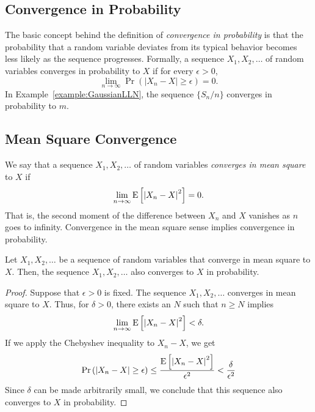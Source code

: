 \subsection{Convergence in Probability}

The basic concept behind the definition of \emph{convergence in probability} is that the probability that a random variable deviates from its typical behavior becomes less likely as the sequence progresses. 
Formally, a sequence $X_1, X_2, \ldots$ of random variables converges in probability to $X$ if for every $\epsilon > 0$,
\begin{equation*}
\lim_{n \rightarrow \infty} \Pr \left( \left| X_n - X \right| \geq \epsilon \right) = 0 .
\end{equation*}
In Example~\ref{example:GaussianLLN}, the sequence $\{ S_n / n \}$ converges in probability to $m$.


\subsection{Mean Square Convergence}

We say that a sequence $X_1, X_2, \ldots$ of random variables \emph{converges in mean square} to $X$ if 
\begin{equation*}
\lim_{n \rightarrow \infty} \mathrm{E} \left[ \left| X_n - X \right|^2 \right] = 0 .
\end{equation*}
That is, the second moment of the difference between $X_n$ and $X$ vanishes as $n$ goes to infinity.
Convergence in the mean square sense implies convergence in probability.

\begin{proposition} \label{proposition:ConvergenceImplication1}
Let $X_1, X_2, \ldots$ be a sequence of random variables that converge in mean square to $X$.
Then, the sequence $X_1, X_2, \ldots$ also converges to $X$ in probability.
\end{proposition}
\begin{proof}
Suppose that $\epsilon > 0$ is fixed.
The sequence $X_1, X_2, \ldots$ converges in mean square to $X$.
Thus, for $\delta > 0$, there exists an $N$ such that $n \geq N$ implies
\begin{equation*}
\lim_{n \rightarrow \infty} \mathrm{E} \left[ \left| X_n - X \right|^2 \right] < \delta .
\end{equation*}
If we apply the Chebyshev inequality to $X_n - X$, we get
\begin{equation*}
\Pr \left( \left| X_n - X \right| \geq \epsilon \right)
\leq \frac{ \mathrm{E} \left[ \left| X_n - X \right|^2 \right] }{ \epsilon^2 }
< \frac{ \delta }{ \epsilon^2 }
\end{equation*}
Since $\delta$ can be made arbitrarily small, we conclude that this sequence also converges to $X$ in probability.
\end{proof}


